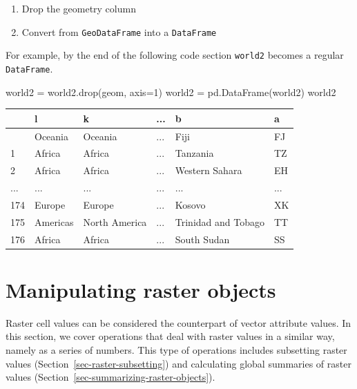 \documentclass[
  letterpaper,
]{krantz}
\newenvironment{Shaded}{\begin{snugshade}}{\end{snugshade}}
\newcommand{\DecValTok}[1]{\textcolor[rgb]{0.68,0.00,0.00}{#1}}
\newcommand{\NormalTok}[1]{\textcolor[rgb]{0.00,0.23,0.31}{#1}}
\newcommand{\OperatorTok}[1]{\textcolor[rgb]{0.37,0.37,0.37}{#1}}
\newcommand{\StringTok}[1]{\textcolor[rgb]{0.13,0.47,0.30}{#1}}
\providecommand{\tightlist}{%
  \setlength{\itemsep}{0pt}\setlength{\parskip}{0pt}}\usepackage{longtable,booktabs,array}
\begin{document}
\begin{enumerate}
\def\labelenumi{\arabic{enumi}.}
\tightlist
\item
  Drop the geometry column
\item
  Convert from \texttt{GeoDataFrame} into a \texttt{DataFrame}
\end{enumerate}

For example, by the end of the following code section \texttt{world2}
becomes a regular \texttt{DataFrame}.

\begin{Shaded}
\begin{Highlighting}[]
\NormalTok{world2 }\OperatorTok{=}\NormalTok{ world2.drop(}\StringTok{\textquotesingle{}geom\textquotesingle{}}\NormalTok{, axis}\OperatorTok{=}\DecValTok{1}\NormalTok{)}
\NormalTok{world2 }\OperatorTok{=}\NormalTok{ pd.DataFrame(world2)}
\NormalTok{world2}
\end{Highlighting}
\end{Shaded}

\begin{longtable}[]{@{}llllll@{}}
\toprule\noalign{}
& l & k & ... & b & a \\
\midrule\noalign{}
\endhead
\bottomrule\noalign{}
\endlastfoot
0 & Oceania & Oceania & ... & Fiji & FJ \\
1 & Africa & Africa & ... & Tanzania & TZ \\
2 & Africa & Africa & ... & Western Sahara & EH \\
... & ... & ... & ... & ... & ... \\
174 & Europe & Europe & ... & Kosovo & XK \\
175 & Americas & North America & ... & Trinidad and Tobago & TT \\
176 & Africa & Africa & ... & South Sudan & SS \\
\end{longtable}

\section{Manipulating raster
objects}\label{sec-manipulating-raster-objects}

Raster cell values can be considered the counterpart of vector attribute
values. In this section, we cover operations that deal with raster
values in a similar way, namely as a series of numbers. This type of
operations includes subsetting raster values
(Section~\ref{sec-raster-subsetting}) and calculating global summaries
of raster values (Section~\ref{sec-summarizing-raster-objects}).
\end{document}
